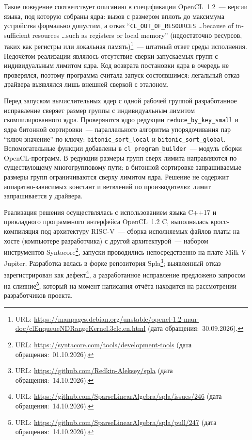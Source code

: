 \documentclass[a4paper]{article}
\begin{document}
Такое поведение соответствует описанию в спецификации OpenCL~1.2~--- версии языка, под которую собраны ядра: вызов с размером вплоть до максимума устройства формально допустим, а отказ \foreignquote{english}{\texttt{CL\_OUT\_OF\_RESOURCES} \dots because of insufficient resources \dots such as registers or local memory} (недостаточно ресурсов, таких как регистры или локальная память)\footnote{URL: \url{https://manpages.debian.org/unstable/opencl-1.2-man-doc/clEnqueueNDRangeKernel.3clc.en.html} (дата обращения:~30.09.2026).}~--- штатный ответ среды исполнения. Недочётом реализации являлось отсутствие сверки запускаемых групп с индивидуальным лимитом ядра. Код возврата постановки ядра в очередь не проверялся, поэтому программа считала запуск состоявшимся: легальный отказ драйвера выявлялся лишь внешней сверкой с эталоном.

Перед запуском вычислительных ядер с одной рабочей группой разработанное исправление сверяет размер группы с индивидуальным лимитом скомпилированного ядра. Проверяются ядро редукции \texttt{reduce\_by\_key\_small} и ядра битонной сортировки~--- параллельного алгоритма упорядочивания пар \enquote{ключ-значение} по ключу: \texttt{bitonic\_sort\_local} и \texttt{bitonic\_sort\_global}. Вспомогательные функции добавлены в \texttt{cl\_program\_builder}~--- модуль сборки OpenCL-программ. В редукции размеры групп сверх лимита направляются по существующему многогрупповому пути; в битонной сортировке запрашиваемые размеры групп ограничиваются сверху лимитом ядра. Решение не содержит аппаратно-зависимых констант и ветвлений по производителю: лимит запрашивается у драйвера.

Реализация решения осуществлялась с использованием языка C++17 и прикладного программного интерфейса OpenCL~1.2 C, выполнялась кросс-компиляция под архитектуру RISC-V~--- сборка исполняемых файлов платы на хосте (компьютере разработчика) с другой архитектурой~--- набором инструментов Syntacore\footnote{URL: \url{https://syntacore.com/tools/development-tools} (дата обращения:~01.10.2026).}, запуски проводились непосредственно на плате Milk-V Jupiter. Разработка велась в форке репозитория Spla\footnote{URL: \url{https://github.com/Redkin-Aleksey/spla} (дата обращения:~14.10.2026).}; выявленный отказ зарегистрирован как дефект\footnote{URL: \url{https://github.com/SparseLinearAlgebra/spla/issues/246} (дата обращения:~14.10.2026).}, а разработанное исправление предложено запросом на слияние\footnote{URL: \url{https://github.com/SparseLinearAlgebra/spla/pull/247} (дата обращения:~14.10.2026).}, который на момент написания отчёта находится на рассмотрении разработчиков проекта.
\end{document}
